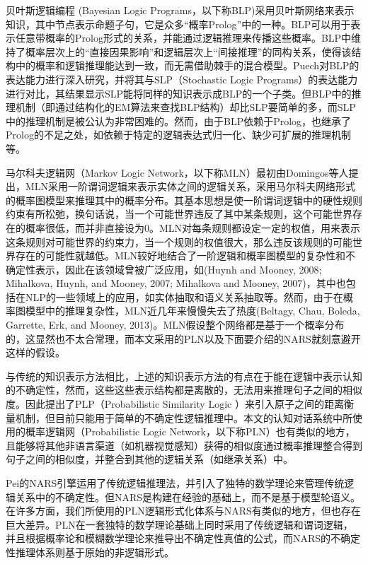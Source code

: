       贝叶斯逻辑编程 (Bayesian Logic Programs，以下称BLP)\cite{Kersting2007}采用贝叶斯网络来表示知识，其中节点表示命题子句，它是众多“概率Prolog”中的一种。BLP可以用于表示任意带概率的Prolog形式的关系，并能通过逻辑推理来传播这些概率。BLP中维持了概率层次上的“直接因果影响”和逻辑层次上“间接推理”的同构关系，使得该结构中的概率和逻辑推理能达到一致，而无需借助棘手的混合模型。Puech\cite{Puech2003}对BLP的表达能力进行深入研究，并将其与SLP（Stochastic Logic Programs）的表达能力进行对比，其结果显示SLP能将同样的知识表示成BLP的一个子类。但BLP中的推理机制（即通过结构化的EM算法来查找BLP结构）却比SLP要简单的多，而SLP中的推理机制是被公认为非常困难的\cite{DaRaett2003}。然而，由于BLP依赖于Prolog，也继承了Prolog的不足之处，如依赖于特定的逻辑表达式归一化、缺少可扩展的推理机制等。
     
     马尔科夫逻辑网（Markov Logic Network，以下称MLN）最初由Domingos等人提出\cite{Domingos2007}，MLN采用一阶谓词逻辑来表示实体之间的逻辑关系，采用马尔科夫网络形式的概率图模型来推理其中的概率分布。其基本思想是使一阶谓词逻辑中的硬性规则约束有所松弛，换句话说，当一个可能世界违反了其中某条规则，这个可能世界存在的概率很低，而并非直接设为0。MLN对每条规则都设定一定的权值，用来表示这条规则对可能世界的约束力，当一个规则的权值很大，那么违反该规则的可能世界存在的可能性就越低。MLN较好地结合了一阶逻辑和概率图模型的复杂性和不确定性表示，因此在该领域曾被广泛应用，如(Huynh and Mooney, 2008; Mihalkova, Huynh, and Mooney, 2007; Mihalkova and Mooney, 2007)，其中也包括在NLP的一些领域上的应用，如实体抽取和语义关系抽取等。然而，由于在概率图模型中的推理复杂性，MLN近几年来慢慢失去了热度(Beltagy, Chau, Boleda, Garrette, Erk, and Mooney, 2013)。MLN假设整个网络都是基于一个概率分布的，这显然也不太合常理，而本文采用的PLN以及下面要介绍的NARS\cite{Wang2006}就刻意避开这样的假设。

     与传统的知识表示方法相比，上述的知识表示方法的有点在于能在逻辑中表示认知的不确定性，然而，这些这些表示结构都是离散的，无法用来推理句子之间的相似度。因此\cite{Brocheler2012}提出了PLP（Probabilistic Similarity Logic ）来引入原子之间的距离衡量机制，但目前只能用于简单的不确定性逻辑推理中。本文的认知对话系统中所使用的概率逻辑网（Probabilistic Logic Network，以下称PLN）也有类似的地方，且能够将其他非语言渠道（如机器视觉感知）获得的相似度通过概率推理整合得到句子之间的相似度，并整合到其他的逻辑关系（如继承关系）中。

      Pei的NARS\cite{Wang2006}引擎运用了传统逻辑推理法，并引入了独特的数学理论来管理传统逻辑关系中的不确定性。但NARS是构建在经验的基础上，而不是基于模型轮语义。 在许多方面，我们所使用的PLN逻辑形式化体系与NARS有类似的地方，但也存在巨大差异。PLN在一套独特的数学理论基础上同时采用了传统逻辑和谓词逻辑，并且根据概率论和模糊数学理论来推导出不确定性真值的公式，而NARS的不确定性推理体系则基于原始的非逻辑形式。

